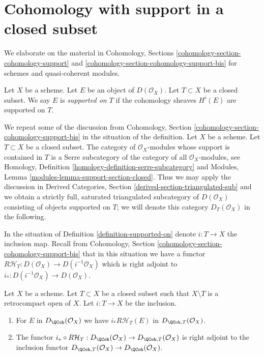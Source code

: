 \section{Cohomology with support in a closed subset}
\label{section-cohomology-support}

\noindent
We elaborate on the material in Cohomology, Sections
\ref{cohomology-section-cohomology-support} and
\ref{cohomology-section-cohomology-support-bis} for schemes
and quasi-coherent modules.

\begin{definition}
\label{definition-supported-on}
Let $X$ be a scheme. Let $E$ be an object of $D(\mathcal{O}_X)$.
Let $T \subset X$ be a closed subset.
We say $E$ is {\it supported on $T$} if the
cohomology sheaves $H^i(E)$ are supported on $T$.
\end{definition}

\noindent
We repeat some of the discussion from
Cohomology, Section \ref{cohomology-section-cohomology-support-bis}
in the situation of the definition.
Let $X$ be a scheme. Let $T \subset X$ be a closed subset.
The category of $\mathcal{O}_X$-modules whose
support is contained in $T$ is a Serre subcategory of the
category of all $\mathcal{O}_X$-modules, see
Homology, Definition \ref{homology-definition-serre-subcategory}
and
Modules, Lemma \ref{modules-lemma-support-section-closed}.
Thus we may apply the discussion in
Derived Categories, Section \ref{derived-section-triangulated-sub}
and we obtain a strictly full, saturated triangulated subcategory of
$D(\mathcal{O}_X)$ consisting of objects supported on $T$; we will
denote this category $D_T(\mathcal{O}_X)$ in the following.

\medskip\noindent
In the situation of Definition \ref{definition-supported-on}
denote $i : T \to X$ the inclusion map. Recall from
Cohomology, Section \ref{cohomology-section-cohomology-support-bis}
that in this situation we have a functor
$R\mathcal{H}_T : D(\mathcal{O}_X) \to D(i^{-1}\mathcal{O}_X)$
which is right adjoint to $i_* : D(i^{-1}\mathcal{O}_X) \to D(\mathcal{O}_X)$.

\begin{lemma}
\label{lemma-support-quasi-coherent}
Let $X$ be a scheme. Let $T \subset X$ be a closed subset such that
$X \setminus T$ is a retrocompact open of $X$. Let $i : T \to X$ be
the inclusion.
\begin{enumerate}
\item For $E$ in $D_\QCoh(\mathcal{O}_X)$ we have
$i_*R\mathcal{H}_T(E)$ in $D_{\QCoh, T}(\mathcal{O}_X)$.
\item The functor
$i_* \circ R\mathcal{H}_T : D_\QCoh(\mathcal{O}_X) \to
D_{\QCoh, T}(\mathcal{O}_X)$ is right adjoint to the inclusion functor
$D_{\QCoh, T}(\mathcal{O}_X) \to D_\QCoh(\mathcal{O}_X)$.
\end{enumerate}
\end{lemma}

